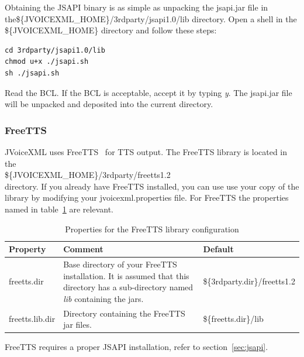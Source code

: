 \documentclass[11pt,a4paper]{article}
\begin{document}
Obtaining the JSAPI binary is as simple as unpacking
the jsapi.jar file in the\$\{JVOICEXML\_HOME\}/3rdparty/jsapi1.0/lib
directory. Open a shell in the \$\{JVOICEXML\_HOME\} directory and
follow these steps:

\begin{lstlisting}
cd 3rdparty/jsapi1.0/lib
chmod u+x ./jsapi.sh
sh ./jsapi.sh
\end{lstlisting}

Read the BCL. If the BCL is acceptable, accept it by typing \emph{y}.
The jsapi.jar file will be unpacked and deposited into the current directory.

\subsubsection{FreeTTS}
\label{sec:freetts}

JVoiceXML uses FreeTTS~\cite{freetts} for TTS output.
The FreeTTS library is located in the \\
\$\{JVOICEXML\_HOME\}/3rdparty/freetts1.2 \\
directory. If you already have FreeTTS installed, you can use
use your copy of the library by modifying your jvoicexml.properties file.
For FreeTTS the properties named in table~\ref{tab:freetts_properties} are 
relevant.

\begin{table}[h]
\caption{Properties for the FreeTTS library configuration}
\label{tab:freetts_properties}

\begin{center}

\begin{tabular}{|l|p{4cm}|l|}
\hline
\textbf{Property} & \textbf{Comment} & \textbf{Default} \\
\hline
\hline
freetts.dir & 
Base directory of your FreeTTS installation.
It is assumed that this directory
has a sub-directory named \emph{lib} containing the jars.
& \$\{3rdparty.dir\}/freetts1.2 \\
\hline
freetts.lib.dir & 
Directory containing the FreeTTS jar files.
& \$\{freetts.dir\}/lib \\
\hline
\end{tabular}

\end{center}

\end{table}

FreeTTS requires a proper JSAPI installation, refer to section~\ref{sec:jsapi}.
\end{document}
